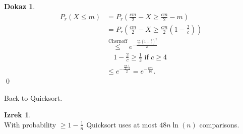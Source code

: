 \documentclass[a4paper, 12pt]{book}
\theoremstyle{definition}
\newtheorem{theorem}[counter]{Izrek}
\newtheorem{pro}[counter]{Dokaz}
\theoremstyle{remark}
\begin{document}
\begin{pro}
  \begin{align*}
    P_r(X \leq m) &= P_r(\frac{cm}{2} - X \geq \frac{cm}{2} - m) \\
    &= P_r(\frac{cm}{2} - X \geq \frac{cm}{2} (1 - \frac{2}{c})) \\
    &\stackrel{\text{Chernoff}}{\leq} e^{-\frac{\frac{cm}{2} (1-\frac{2}{c})^2}{2}} \\
    &\quad 1-\frac{2}{c} \geq \frac{1}{2} \text{ if } c \geq 4 \\
    &\leq e^{-\frac{\frac{cm}{2} \frac{1}{4}}{2}} = e^{-\frac{cm}{16}}.
  \end{align*}
  \qed
\end{pro}
Back to Quicksort.
\begin{theorem} \text{} \\
  With probability $\geq 1 - \frac{1}{n}$ Quicksort uses at most $48n\ln(n)$ comparisons.
\end{theorem}
\end{document}
